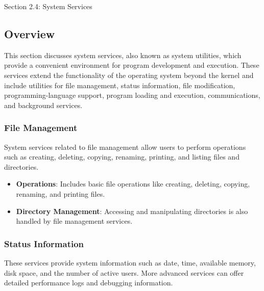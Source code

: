 \begin{notes}{Section 2.4: System Services}
    \subsection*{Overview}

    This section discusses system services, also known as system utilities, which provide a convenient environment for program development and execution. These services extend the functionality of the 
    operating system beyond the kernel and include utilities for file management, status information, file modification, programming-language support, program loading and execution, communications, 
    and background services.
    
    \subsubsection*{File Management}
    
    System services related to file management allow users to perform operations such as creating, deleting, copying, renaming, printing, and listing files and directories.
    
    \begin{highlight}
    
    \begin{itemize}
        \item \textbf{Operations}: Includes basic file operations like creating, deleting, copying, renaming, and printing files.
        \item \textbf{Directory Management}: Accessing and manipulating directories is also handled by file management services.
    \end{itemize}
    
    \end{highlight}
    
    \subsubsection*{Status Information}
    
    These services provide system information such as date, time, available memory, disk space, and the number of active users. More advanced services can offer detailed performance logs and debugging information.
    
    \begin{highlight}
    

\end{highlight}
\end{notes}
